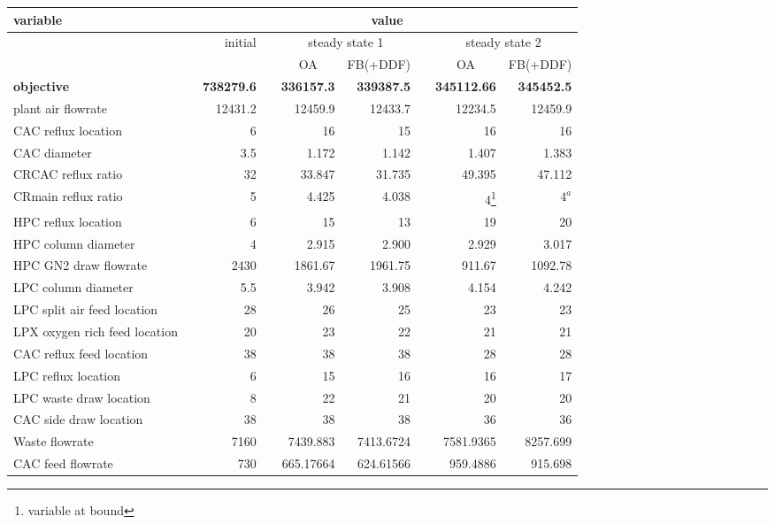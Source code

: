 \begin{minipage}{\linewidth}
\center
\renewcommand{\footnoterule}{}
\begin{tabular}{lcrcrrcrr}
    variable & & \multicolumn{7}{c}{value} \\ \hline
    \rowcolor{white} & & \multirow{2}{*}{initial} & & \multicolumn{2}{c}{steady state 1} & & \multicolumn{2}{c}{steady state 2} \\
    & & & & \multicolumn{1}{c}{OA} & \multicolumn{1}{c}{FB(+DDF)} & & \multicolumn{1}{c}{OA} & \multicolumn{1}{c}{FB(+DDF)} \\ \hline
    \textbf{objective} & & \textbf{738279.6} & & \textbf{336157.3} & \textbf{339387.5}  && \textbf{345112.66} & \textbf{345452.5} \\
    plant air flowrate & & 12431.2 & & 12459.9 & 12433.7 & & 12234.5 & 12459.9 \\
    CAC reflux location & & 6 & & 16 & 15 & & 16 & 16 \\
    CAC diameter  & & 3.5 & & 1.172 & 1.142 & & 1.407 & 1.383 \\
    CRCAC reflux ratio & & 32 & & 33.847 & 31.735 & & 49.395 & 47.112 \\
    CRmain reflux ratio & & 5 & & 4.425 & 4.038 & & 4\footnote{variable at bound} & $4^a$ \\
    HPC reflux location & & 6 & & 15 & 13 & & 19 & 20 \\
    HPC column diameter & & 4 & & 2.915 & 2.900 & & 2.929 & 3.017 \\
    HPC GN2 draw flowrate & & 2430 & & 1861.67 & 1961.75 & & 911.67 & 1092.78 \\
    LPC column diameter & & 5.5 & & 3.942 & 3.908 & & 4.154 & 4.242 \\
    LPC split air feed location & & 28 & & 26 & 25 & & 23 & 23 \\
    LPX oxygen rich feed location & & 20 & & 23 & 22 & & 21 & 21 \\
    CAC reflux feed location & & 38 & & 38 & 38 & & 28 & 28 \\
    LPC reflux location & & 6 & & 15 &  16 & & 16 & 17 \\
    LPC waste draw location & & 8 & & 22 & 21 & & 20 & 20 \\
    CAC side draw location & & 38 & & 38 & 38 & & 36 & 36 \\
    Waste flowrate &  & 7160 & & 7439.883 & 7413.6724 & & 7581.9365 & 8257.699 \\
    CAC feed flowrate & & 730 & & 665.17664 & 624.61566 & & 959.4886 & 915.698 \\
\end{tabular}
\end{minipage}


